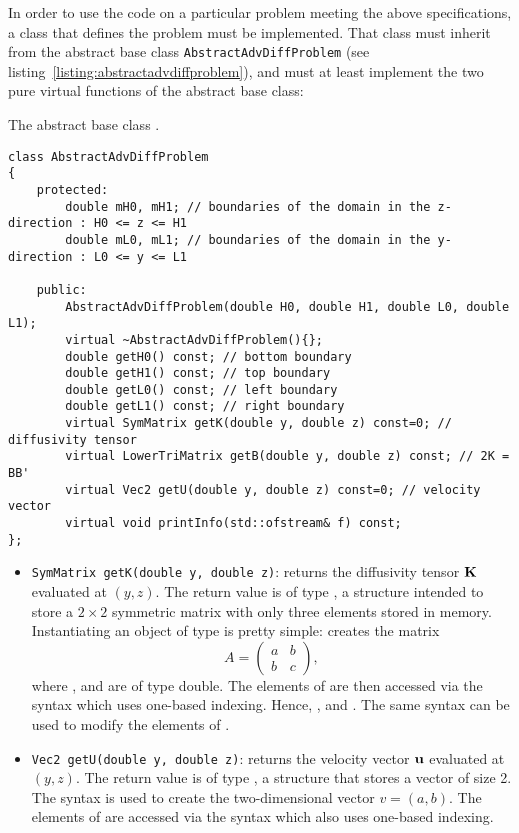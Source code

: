 In order to use the code on a particular problem meeting the above specifications, a class that defines the problem must be implemented. That class must inherit from the abstract base class \texttt{AbstractAdvDiffProblem} (see listing~\ref{listing:abstractadvdiffproblem}), and must at least implement the two pure virtual functions of the abstract base class:
\begin{listing}[ht!]
\caption{The abstract base class .}
\label{listing:abstractadvdiffproblem}
\begin{verbatim}
class AbstractAdvDiffProblem
{
	protected:
		double mH0, mH1; // boundaries of the domain in the z-direction : H0 <= z <= H1
		double mL0, mL1; // boundaries of the domain in the y-direction : L0 <= y <= L1

	public:
		AbstractAdvDiffProblem(double H0, double H1, double L0, double L1);
		virtual ~AbstractAdvDiffProblem(){};
		double getH0() const; // bottom boundary
		double getH1() const; // top boundary 
		double getL0() const; // left boundary
		double getL1() const; // right boundary
		virtual SymMatrix getK(double y, double z) const=0; // diffusivity tensor
		virtual LowerTriMatrix getB(double y, double z) const; // 2K = BB'
		virtual Vec2 getU(double y, double z) const=0; // velocity vector
		virtual void printInfo(std::ofstream& f) const;
};
\end{verbatim}
\end{listing}
\begin{itemize}[nosep]
	\item \texttt{SymMatrix getK(double y, double z)}: returns the diffusivity tensor $\mathbf K$ evaluated at $(y,z)$. The return value is of type , a structure intended to store a $2\times 2$ symmetric matrix with only three elements stored in memory. Instantiating an object  of type  is pretty simple:  creates the matrix
	\[
		A = \begin{pmatrix} a & b \\ b & c \end{pmatrix},
	\] 
	where ,  and  are of type double. The elements of  are then accessed via the syntax  which uses one-based indexing. Hence, ,  and . The same syntax can be used to modify the elements of .
	\item \texttt{Vec2 getU(double y, double z)}: returns the velocity vector $\mathbf u$ evaluated at $(y,z)$. The return value is of type , a structure that stores a vector of size 2. The syntax  is used to create the two-dimensional vector $v = (a,b)$. The elements of  are accessed via the syntax  which also uses one-based indexing.
\end{itemize}
